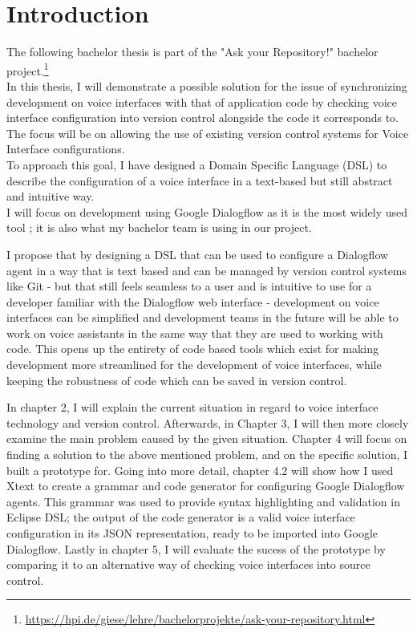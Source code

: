 
\chapter{Introduction}

The following bachelor thesis is part of the "Ask your Repository!" bachelor project.\footnote{\url{https://hpi.de/giese/lehre/bachelorprojekte/ask-your-repository.html}}\\
In this thesis, I will demonstrate a possible solution for the issue of synchronizing development on voice interfaces with that of application code by checking voice interface configuration into version control alongside the code it corresponds to. The focus will be on allowing the use of existing version control systems for Voice Interface configurations.\\
To approach this goal, I have designed a Domain Specific Language (DSL) to describe the configuration of a voice interface in a text-based but still abstract and intuitive way. \\
I will focus on development using Google Dialogflow as it is the most widely used tool \cite{Stackshare}; it is also what my bachelor team is using in our project.

I propose that by designing a DSL that can be used to configure a Dialogflow agent in a way that is text based and can be managed by version control systems like Git - but that still feels seamless to a user and is intuitive to use for a developer familiar with the Dialogflow web interface - development on voice interfaces can be simplified and development teams in the future will be able to work on voice assistants in the same way that they are used to working with code. This opens up the entirety of code based tools which exist for making development more streamlined for the development of voice interfaces, while keeping the robustness of code which can be saved in version control.

In chapter 2, I will explain the current situation in regard to voice interface technology and version control. Afterwards, in Chapter 3, I will then more closely examine the main problem caused by the given situation.
Chapter 4 will focus on finding a solution to the above mentioned problem, and on the specific solution, I built a prototype for. Going into more detail, chapter 4.2 will show how I used Xtext to create a grammar and code generator for configuring Google Dialogflow agents. This grammar was used to provide syntax highlighting and validation in Eclipse DSL; the output of the code generator is a valid voice interface configuration in its JSON representation, ready to be imported into Google Dialogflow.
Lastly in chapter 5, I will evaluate the sucess of the prototype by comparing it to an alternative way of checking voice interfaces into source control. 


